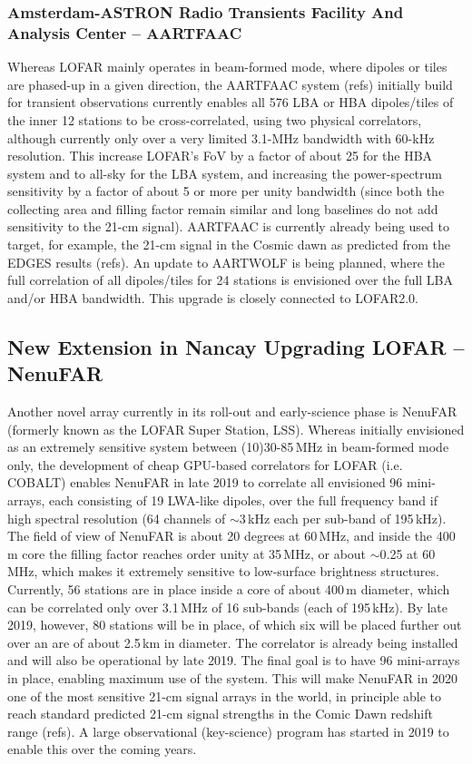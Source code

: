 \subsubsection{Amsterdam-ASTRON Radio Transients Facility And Analysis Center -- AARTFAAC}

Whereas LOFAR mainly operates in beam-formed mode, where dipoles or tiles are phased-up in a given direction, the AARTFAAC system (refs) initially build for transient observations currently enables all 576 LBA or HBA dipoles/tiles of the inner 12 stations to be cross-correlated, using two physical correlators, although currently only over a very limited 3.1-MHz bandwidth with 60-kHz resolution. This increase LOFAR's FoV by a factor of about 25 for the HBA system and to all-sky for the LBA system, and increasing the power-spectrum sensitivity by a factor of about 5 or more per unity bandwidth (since both the collecting area and filling factor remain similar and long baselines do not add sensitivity to the 21-cm signal). AARTFAAC is currently already being used to target, for example, the 21-cm signal in the Cosmic dawn as predicted from the EDGES results (refs). An update to AARTWOLF is being planned, where the full correlation of all dipoles/tiles for 24 stations is envisioned over the full LBA and/or HBA bandwidth. This upgrade is closely connected to LOFAR2.0.  

\subsection{New Extension in Nancay Upgrading LOFAR -- NenuFAR}

Another novel array currently in its roll-out and early-science phase is NenuFAR (formerly known as the LOFAR Super Station, LSS). Whereas initially envisioned as an extremely sensitive system between (10)30-85\,MHz in beam-formed mode only, the development of cheap GPU-based correlators for LOFAR (i.e. COBALT) enables NenuFAR in late 2019 to correlate all envisioned 96 mini-arrays, each consisting of 19 LWA-like dipoles, over the full frequency band if high spectral resolution (64 channels of $\sim$3\,kHz each per sub-band of 195\,kHz). The field of view of NenuFAR is about 20 degrees at 60\,MHz, and inside the 400\,m core the filling factor reaches order unity at 35\,MHz, or about $\sim$0.25 at 60\,MHz, which makes it extremely sensitive to low-surface brightness structures. Currently, 56 stations are in place inside a core of about 400\,m diameter, which can be correlated only over 3.1\,MHz of 16 sub-bands (each of 195\,kHz). By late 2019, however, 80 stations will be in place, of which six will be placed further out over an are of about 2.5\,km in diameter. The correlator is already being installed and will also be operational by late 2019. The final goal is to have 96 mini-arrays in place, enabling maximum use of the system. This will make NenuFAR in 2020 one of the most sensitive 21-cm signal arrays in the world, in principle able to reach standard predicted 21-cm signal strengths in the Comic Dawn redshift range (refs). A large observational (key-science) program has started in 2019 to enable this over the coming years.     

